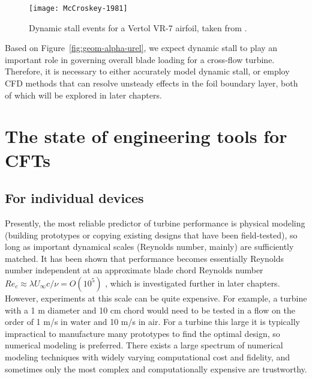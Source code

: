 \begin{figure}
    \centering
    
    \texttt{[image: McCroskey-1981]}
    
    \caption{Dynamic stall events for a Vertol VR-7 airfoil, taken from
        \cite{McCroskey1981}.}

    \label{fig:McCroskey}
\end{figure}

Based on Figure~\ref{fig:geom-alpha-urel}, we expect dynamic stall to play an
important role in governing overall blade loading for a cross-flow turbine.
Therefore, it is necessary to either accurately model dynamic stall, or employ
CFD methods that can resolve unsteady effects in the foil boundary layer, both
of which will be explored in later chapters.


\section{The state of engineering tools for CFTs}

\subsection{For individual devices}

Presently, the most reliable predictor of turbine performance is physical
modeling (building prototypes or copying existing designs that have been
field-tested), so long as important dynamical scales (Reynolds number, mainly)
are sufficiently matched. It has been shown that performance becomes essentially
Reynolds number independent at an approximate blade chord Reynolds number $Re_c
\approx \lambda U_\infty c / \nu = O(10^5)$ \cite{Bravo2007}, which is
investigated further in later chapters. However, experiments at this scale can
be quite expensive. For example, a turbine with a 1 m diameter and 10 cm chord
would need to be tested in a flow on the order of 1 m/s in water and 10 m/s in
air. For a turbine this large it is typically impractical to manufacture many
prototypes to find the optimal design, so numerical modeling is preferred. There
exists a large spectrum of numerical modeling techniques with widely varying
computational cost and fidelity, and sometimes only the most complex and
computationally expensive are trustworthy.

